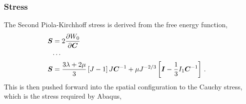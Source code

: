 \documentclass[10pt,letterpaper,oneside]{report}
\newcommand{\ten}[1]{\mbox{\boldmath $#1$}{}}
\begin{document}
\begin{itemize}
\subsubsection{Stress}
The Second Piola-Kirchhoff stress is derived from the free energy function, 
\begin{align}
\ten{S} ={}& 2 \frac{\partial W_0}{\partial \ten{C}}  
\\
\cdots{}& \notag \\
\ten{S} ={}& \frac{3 \lambda + 2 \mu}{3} \left[ J - 1 \right] J \ten{C}^{-1} + \mu J^{-2/3} \left[ \ten{I} - \frac{1}{3} I_1 \ten{C}^{-1} \right] \, . 
\end{align}
This is then pushed forward into the spatial configuration to the Cauchy stress, which is the stress required by Abaqus, 

\end{itemize}
\end{document}
